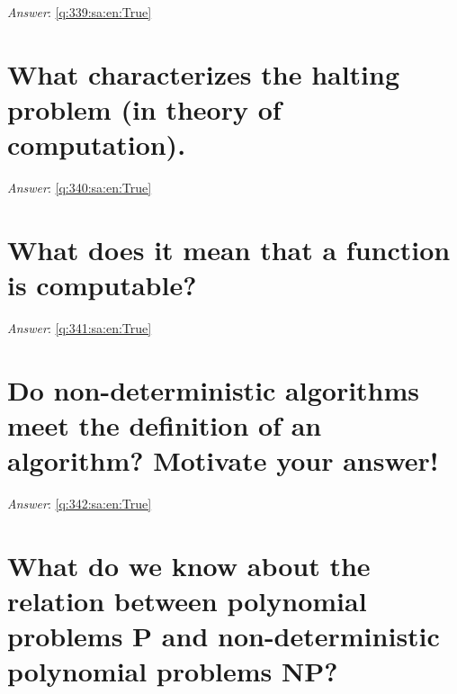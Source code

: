 \documentclass[a4paper,11pt,oneside]{book}
\begin{document}
\begin{sloppypar}
\vspace{1cm}

\textit{Answer}: \autoref{q:339:sa:en:True}



\section{What characterizes the halting problem (in theory of computation).}

\label{q:340:sa:en:False}

\vspace{2cm}

\noindent\makebox[\textwidth]{\hrulefill}

\vspace{1cm}

\textit{Answer}: \autoref{q:340:sa:en:True}



\section{What does it mean that a function is computable?}

\label{q:341:sa:en:False}

\vspace{2cm}

\noindent\makebox[\textwidth]{\hrulefill}

\vspace{1cm}

\textit{Answer}: \autoref{q:341:sa:en:True}



\section{Do non-deterministic algorithms meet the definition of an algorithm? Motivate your answer!}

\label{q:342:sa:en:False}

\vspace{2cm}

\noindent\makebox[\textwidth]{\hrulefill}

\vspace{1cm}

\textit{Answer}: \autoref{q:342:sa:en:True}



\section{What do we know about the relation between polynomial problems P and non-deterministic polynomial problems NP?}


\end{sloppypar}
\end{document}
